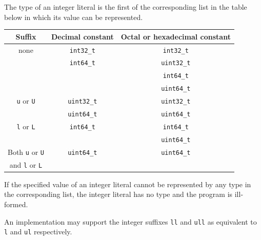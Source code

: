 \p The type of an integer literal is the first of the corresponding list in the
table below in which its value can be represented.

\begin{center}
  \begin{tabular}{|| c | c | c ||}
    \hline
    Suffix & Decimal constant & Octal or hexadecimal constant \\
    \hline
    \hline
    none & \texttt{int32\_t} & \texttt{int32\_t} \\
         & \texttt{int64\_t} & \texttt{uint32\_t} \\
         &         & \texttt{int64\_t} \\
         &         & \texttt{uint64\_t} \\
    \hline
    \texttt{u} or \texttt{U} & \texttt{uint32\_t} & \texttt{uint32\_t} \\
                             & \texttt{uint64\_t} & \texttt{uint64\_t} \\
    \hline
    \texttt{l} or \texttt{L} & \texttt{int64\_t} & \texttt{int64\_t} \\
                             &  & \texttt{uint64\_t} \\
    \hline
    Both \texttt{u} or \texttt{U} & \texttt{uint64\_t} & \texttt{uint64\_t} \\
    and \texttt{l} or \texttt{L}  &  &  \\
    \hline
  \end{tabular}
\end{center}

\p If the specified value of an integer literal cannot be represented by any
type in the corresponding list, the integer literal has no type and the program
is ill-formed.

\p An implementation may support the integer suffixes \texttt{ll} and
\texttt{ull} as equivalent to \texttt{l} and \texttt{ul} respectively.



